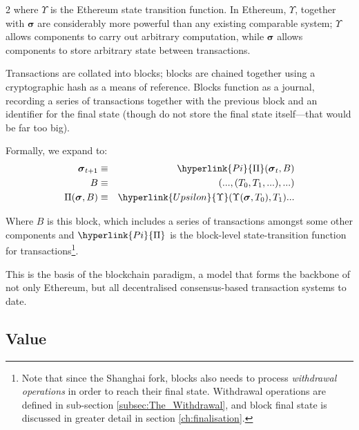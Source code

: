 \documentclass[9pt,oneside]{amsart}
\begin{document}
\begin{multicols}{2}
where $\Upsilon$ is the Ethereum state transition function. In Ethereum, $\Upsilon$, together with $\boldsymbol{\sigma}$ are considerably more powerful than any existing comparable system; $\Upsilon$ allows components to carry out arbitrary computation, while $\boldsymbol{\sigma}$ allows components to store arbitrary state between transactions.

Transactions are collated into blocks; blocks are chained together using a cryptographic hash as a means of reference. Blocks function as a journal, recording a series of transactions together with the previous block and an identifier for the final state (though do not store the final state itself---that would be far too big).

Formally, we expand to:
\begin{eqnarray}
\boldsymbol{\sigma}_{t+1} & \equiv & \hyperlink{Pi}{\Pi}(\boldsymbol{\sigma}_{t}, B) \\
B & \equiv & (..., (T_0, T_1, ...), ...) \\
\Pi(\boldsymbol{\sigma}, B) & \equiv & \hyperlink{Upsilon}{\Upsilon}(\Upsilon(\boldsymbol{\sigma}, T_0), T_1) ...
\end{eqnarray}

Where \hyperlink{block}{$B$} is this block, which includes a series of transactions amongst some other components and $\hyperlink{Pi}{\Pi}$ is the block-level state-transition function for transactions\footnote{Note that since the Shanghai fork, blocks also needs to process \textit{withdrawal operations} in order to reach their final state. Withdrawal operations are defined in sub-section \ref{subsec:The_Withdrawal}, and block final state is discussed in greater detail in section \ref{ch:finalisation}.}.

This is the basis of the blockchain paradigm, a model that forms the backbone of not only Ethereum, but all decentralised consensus-based transaction systems to date.

\subsection{Value}


\end{multicols}
\end{document}
